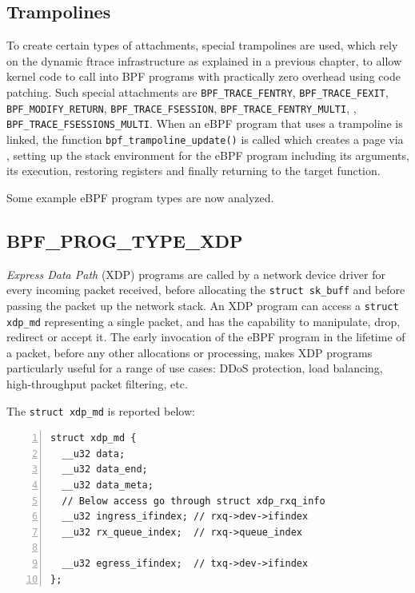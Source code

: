 \subsection{Trampolines}

To create certain types of attachments, special trampolines are used, which rely
on the dynamic ftrace infrastructure as explained in a previous chapter, to
allow kernel code to call into BPF programs with practically zero overhead using
code patching. Such special attachments are \verb|BPF_TRACE_FENTRY|,
\verb|BPF_TRACE_FEXIT|, \verb|BPF_MODIFY_RETURN|, \verb|BPF_TRACE_FSESSION|,
\verb|BPF_TRACE_FENTRY_MULTI|, ,
\verb|BPF_TRACE_FSESSIONS_MULTI|. When an eBPF program that uses a trampoline is
linked, the function \verb|bpf_trampoline_update()| is called which creates a
page via , setting up the stack environment
for the eBPF program including its arguments, its execution, restoring registers
and finally returning to the target function.

Some example eBPF program types are now analyzed.

\subsection{BPF\_PROG\_TYPE\_XDP}

\textit{Express Data Path} (XDP) programs are called by a network device driver
for every incoming packet received, before allocating the \verb|struct sk_buff|
and before passing the packet up the network stack. An XDP program can access a
\verb|struct xdp_md| representing a single packet, and has the capability to
manipulate, drop, redirect or accept it. The early invocation of the eBPF
program in the lifetime of a packet, before any other allocations or processing,
makes XDP programs particularly useful for a range of use cases: DDoS
protection, load balancing, high-throughput packet filtering, etc.

The \verb|struct xdp_md| is reported below:

\begin{Verbatim}[numbers=left, numbersep=5pt, frame=single]
struct xdp_md {
  __u32 data;
  __u32 data_end;
  __u32 data_meta;
  // Below access go through struct xdp_rxq_info
  __u32 ingress_ifindex; // rxq->dev->ifindex
  __u32 rx_queue_index;  // rxq->queue_index

  __u32 egress_ifindex;  // txq->dev->ifindex
};
\end{Verbatim}

